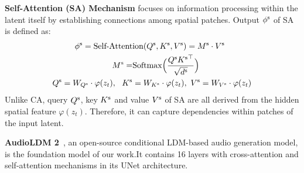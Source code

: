 \textbf{Self-Attention (SA) Mechanism} focuses on information processing within the latent itself by establishing connections among spatial patches. Output $\phi^{\rm s}$ of SA is defined as:
\begin{align}
	\phi^{\rm s} = \text{Self-Attent}&\text{ion}(Q^{\rm s},K^{\rm s},V^{\rm s}) = M^{\rm s}\cdot V^{\rm s} \\
	M^{\rm s}=&{\rm Softmax}\Big(\frac{Q^{\rm s}{K^{\rm s}}^\top}{\sqrt{d^{\rm s}}}\Big) \\
	Q^{\rm s}=W_{Q^{\rm s}}\cdot \varphi(z_t),\ \ K^{\rm s}&=W_{K^{\rm s}}\cdot \varphi(z_t),\ V^{\rm s}=W_{V^{\rm s}}\cdot \varphi(z_t)
\end{align}
Unlike CA, query $Q^{\rm s}$, key $K^{\rm s}$ and value $V^{\rm s}$ of SA are all derived from the hidden spatial feature $\varphi(z_t)$. Therefore, it can capture dependencies within patches of the input latent.

\textbf{AudioLDM 2}~\cite{audioldm2}, an open-source conditional LDM-based audio generation model, is the foundation model of our work.It contains 16 layers with cross-attention and self-attention mechanisms in its UNet architecture.

\begin{table}
  \caption{Probing accuracy of CA map in different layers.}
  \label{tab:ca-analysis}
  \small
  \setlength{\tabcolsep}{2pt}  
\end{table}

